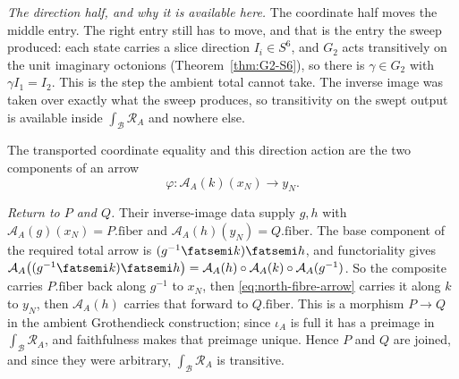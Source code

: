 \medskip
\noindent\emph{The direction half, and why it is available here.}
The coordinate half moves the middle entry. The right entry still has to move,
and that is the entry the sweep produced: each state carries a slice direction
$I_i\in S^6$, and $G_2$ acts transitively on the unit imaginary octonions
\textup{(}Theorem~\ref{thm:G2-S6}\textup{)}, so there is $\gamma\in G_2$ with
$\gamma I_1=I_2$. This is the step the ambient total cannot take. The inverse
image was taken over exactly what the sweep produces, so transitivity on the
swept output is available inside $\int_{\mathcal B}\mathcal R_A$ and nowhere
else.

The transported coordinate equality and this direction action are the two
components of an arrow
\[
  \varphi:\mathcal A_A(k)(x_N)\longrightarrow y_N .
                                    \tag{$\Phi$}\label{eq:north-fibre-arrow}
\]

\medskip
\noindent\emph{Return to $P$ and $Q$.}
Their inverse-image data supply $g,h$ with
$\mathcal A_A(g)(x_N)=P.\mathrm{fiber}$ and
$\mathcal A_A(h)(y_N)=Q.\mathrm{fiber}$. The base component of the required
total arrow is $(g^{-1}\fatsemi k)\fatsemi h$, and functoriality gives
$\mathcal A_A\bigl((g^{-1}\fatsemi k)\fatsemi h\bigr)
 =\mathcal A_A(h)\circ\mathcal A_A(k)\circ\mathcal A_A(g^{-1})$. So the
composite carries $P.\mathrm{fiber}$ back along $g^{-1}$ to $x_N$, then
\eqref{eq:north-fibre-arrow} carries it along $k$ to $y_N$, then
$\mathcal A_A(h)$ carries that forward to $Q.\mathrm{fiber}$. This is a
morphism $P\to Q$ in the ambient Grothendieck construction; since $\iota_A$ is
full it has a preimage in $\int_{\mathcal B}\mathcal R_A$, and faithfulness
makes that preimage unique. Hence $P$ and $Q$ are joined, and since they were
arbitrary, $\int_{\mathcal B}\mathcal R_A$ is transitive.
